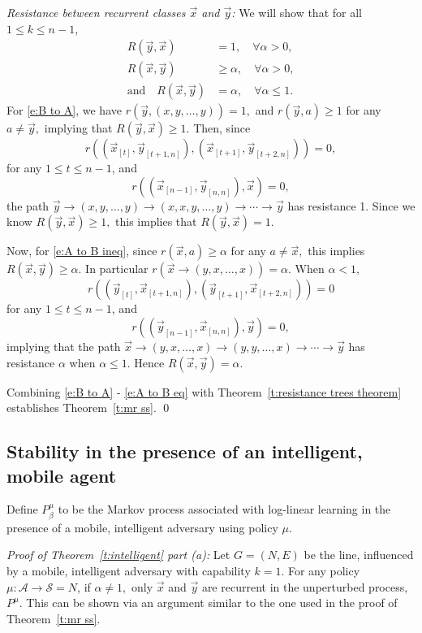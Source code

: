 \noindent\emph{Resistance between recurrent classes $\vec{x}$ and $ \vec{y}$:} We will show that for all $1\leq k\leq n-1$,
\begin{align}
R( \vec{y}, \vec{x}) &= 1,\quad\forall \alpha >0, \label{e:B to A}\\
R(\vec{x}, \vec{y}) &\geq \alpha,\quad\forall\alpha >0,\label{e:A to B ineq}\\
\text{and}\quad R(\vec{x}, \vec{y})&=\alpha, \quad \forall \alpha \leq 1.\label{e:A to B eq}
\end{align}
For \eqref{e:B to A}, we have
$r( \vec{y}, (x,y,\ldots,y)) = 1,$
and $r( \vec{y},a) \geq 1$ for any $a\neq  \vec{y},$ implying that $R( \vec{y}, \vec{x}) \geq 1.$ Then, since 
$$r\left((\vec{x}_{[t]}, \vec{y}_{[t+1,n]}),(\vec{x}_{[t+1]}, \vec{y}_{[t+2,n]}) \right)= 0,$$
for any $1\leq t\leq n-1$, and 
$$r\left((\vec{x}_{[n-1]}, \vec{y}_{[n,n]}),\vec{x}\right) = 0,$$ the path 
$ \vec{y}\to(x,y,\ldots,y)\to (x,x,y,\ldots,y)\to\cdots\to  \vec{y}$
has resistance 1. Since we know $R( \vec{y}, \vec{x}) \geq 1,$ this implies that $R( \vec{y}, \vec{x}) = 1.$

Now, for \eqref{e:A to B ineq}, since $r(\vec{x}, a)\geq \alpha$
for any $a\neq \vec{x},$ this implies $R(\vec{x}, \vec{y}) \geq \alpha.$ In particular $r(\vec{x}\to (y,x,\ldots,x)) = \alpha.$ When $\alpha <1,$ 
$$r\left(( \vec{y}_{[t]},\vec{x}_{[t+1,n]}),( \vec{y}_{[t+1]},\vec{x}_{[t+2,n]})\right) = 0$$
for any $1\leq t\leq n-1$, and
$$r\left(( \vec{y}_{[n-1]},\vec{x}_{[n,n]}), \vec{y}\right) = 0,$$
implying that the path 
$\vec{x}\to (y,x,\ldots,x)\to (y,y,\ldots,x)\to\cdots\to  \vec{y}$
has resistance $\alpha$ when $\alpha \leq 1.$ Hence $R(\vec{x}, \vec{y}) = \alpha.$

Combining \eqref{e:B to A} - \eqref{e:A to B eq} with Theorem~\ref{t:resistance trees theorem} establishes Theorem~\ref{t:mr ss}.
\hfill\qed

\subsection{Stability in the presence of an intelligent, mobile agent}\label{a:intelligent proof}

Define $P^\mu_\beta$ to be the Markov process associated with log-linear learning in the presence of a mobile, intelligent adversary using policy $\mu.$

\noindent\emph{Proof of Theorem~\ref{t:intelligent} part (a):}
Let $G = (N,E)$ be the line, influenced by a mobile, intelligent adversary with capability $k = 1.$ For any policy $\mu:\mathcal{A}\to\mathcal{S} = N$, if $\alpha \neq 1,$ only $\vec{x}$ and $ \vec{y}$ are recurrent in the unperturbed process, $P^\mu$. This can be shown via an argument similar to the one used in the proof of Theorem~\ref{t:mr ss}. 

